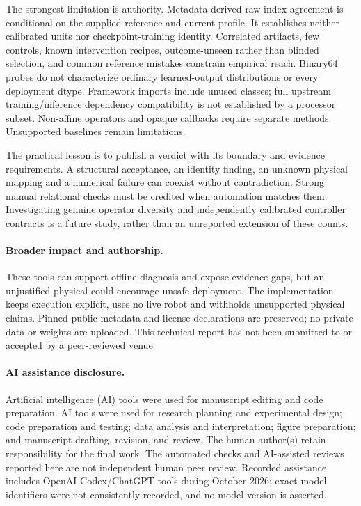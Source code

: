 The strongest limitation is authority. Metadata-derived raw-index agreement is conditional on the supplied reference and current profile. It establishes neither calibrated units nor checkpoint-training identity. Correlated artifacts, few controls, known intervention recipes, outcome-unseen rather than blinded selection, and common reference mistakes constrain empirical reach. Binary64 probes do not characterize ordinary learned-output distributions or every deployment dtype. Framework imports include unused classes; full upstream training/inference dependency compatibility is not established by a processor subset. Non-affine operators and opaque callbacks require separate methods. Unsupported baselines remain limitations.

The practical lesson is to publish a verdict with its boundary and evidence requirements. A structural acceptance, an identity finding, an unknown physical mapping and a numerical failure can coexist without contradiction. Strong manual relational checks must be credited when automation matches them. Investigating genuine operator diversity and independently calibrated controller contracts is a future study, rather than an unreported extension of these counts.

\paragraph{Broader impact and authorship.}
These tools can support offline diagnosis and expose evidence gaps, but an unjustified physical \PASS{} could encourage unsafe deployment. The implementation keeps execution explicit, uses no live robot and withholds unsupported physical claims. Pinned public metadata and license declarations are preserved; no private data or weights are uploaded. This technical report has not been submitted to or accepted by a peer-reviewed venue.

\begin{samepage}
\paragraph{AI assistance disclosure.}
Artificial intelligence (AI) tools were used for manuscript editing and code preparation.
AI tools were used for research planning and experimental design; code preparation and testing; data analysis and interpretation; figure preparation; and manuscript drafting, revision, and review. The human author(s) retain responsibility for the final work. The automated checks and AI-assisted reviews reported here are not independent human peer review. Recorded assistance includes OpenAI Codex/ChatGPT tools during October 2026; exact model identifiers were not consistently recorded, and no model version is asserted.
\end{samepage}

